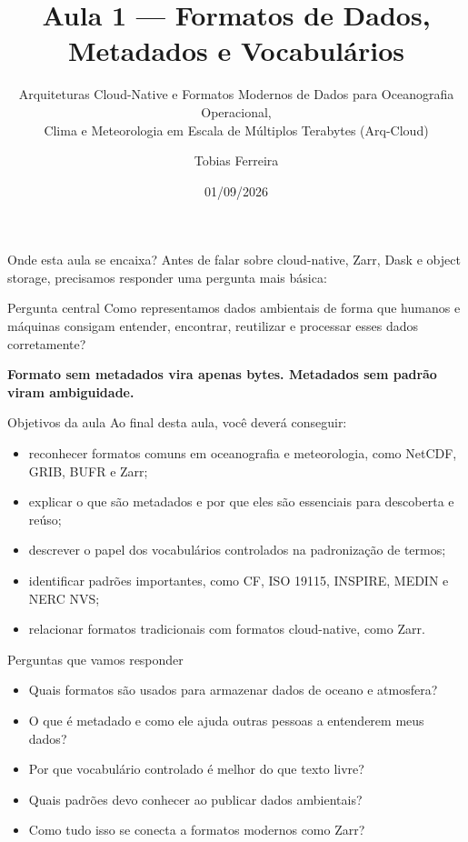 \documentclass[aspectratio=169]{beamer}
\title[Formatos, Metadados e Vocabulários]{Aula 1 --- Formatos de Dados, Metadados e Vocabulários}
\subtitle{Arquiteturas Cloud-Native e Formatos Modernos de Dados para Oceanografia Operacional,\\
Clima e Meteorologia em Escala de Múltiplos Terabytes (Arq-Cloud)}
\author{Tobias Ferreira}
\institute{Instituto Nacional de Pesquisas Oceânicas (INPO)}
\date{01/09/2026}
\begin{document}
\begin{frame}
  \titlepage
\end{frame}

\begin{frame}{Onde esta aula se encaixa?}
\Large
Antes de falar sobre cloud-native, Zarr, Dask e object storage, precisamos responder uma pergunta mais básica:

\vspace{0.5cm}

\begin{block}{Pergunta central}
Como representamos dados ambientais de forma que humanos e máquinas consigam entender, encontrar, reutilizar e processar esses dados corretamente?
\end{block}

\vspace{0.3cm}

\centering
\textbf{Formato sem metadados vira apenas bytes. Metadados sem padrão viram ambiguidade.}
\end{frame}

\begin{frame}{Objetivos da aula}
Ao final desta aula, você deverá conseguir:

\begin{itemize}
  \item reconhecer formatos comuns em oceanografia e meteorologia, como NetCDF, GRIB, BUFR e Zarr;
  \item explicar o que são metadados e por que eles são essenciais para descoberta e reúso;
  \item descrever o papel dos vocabulários controlados na padronização de termos;
  \item identificar padrões importantes, como CF, ISO 19115, INSPIRE, MEDIN e NERC NVS;
  \item relacionar formatos tradicionais com formatos cloud-native, como Zarr.
\end{itemize}
\end{frame}

\begin{frame}{Perguntas que vamos responder}
\Large
\begin{itemize}
  \item Quais formatos são usados para armazenar dados de oceano e atmosfera?
  \item O que é metadado e como ele ajuda outras pessoas a entenderem meus dados?
  \item Por que vocabulário controlado é melhor do que texto livre?
  \item Quais padrões devo conhecer ao publicar dados ambientais?
  \item Como tudo isso se conecta a formatos modernos como Zarr?
\end{itemize}
\end{frame}
\end{document}
